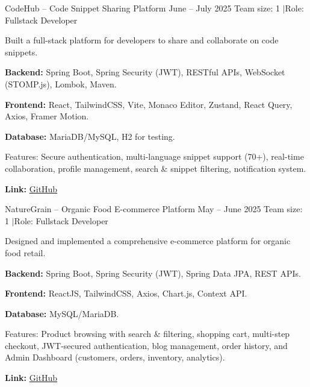 \vspace{4pt}

\projectEntry
    {CodeHub -- Code Snippet Sharing Platform}
    {June -- July 2025}
    {Team size: 1 \enspace$\vert$\enspace Role: Fullstack Developer}

\begin{entryItems}
    \item Built a full-stack platform for developers to share and collaborate on code snippets.
    \item \textbf{Backend:} Spring Boot, Spring Security (JWT), RESTful APIs, WebSocket (STOMP.js), Lombok, Maven.
    \item \textbf{Frontend:} React, TailwindCSS, Vite, Monaco Editor, Zustand, React Query, Axios, Framer Motion.
    \item \textbf{Database:} MariaDB/MySQL, H2 for testing.
    \item Features: Secure authentication, multi-language snippet support (70+), real-time collaboration, profile management, search \& snippet filtering, notification system.
    \item \textbf{Link:} \href{https://github.com/giasinguyen/codehub-platform}{GitHub}
\end{entryItems}

\vspace{4pt}

\projectEntry
    {NatureGrain -- Organic Food E-commerce Platform}
    {May -- June 2025}
    {Team size: 1 \enspace$\vert$\enspace Role: Fullstack Developer}

\begin{entryItems}
    \item Designed and implemented a comprehensive e-commerce platform for organic food retail.
    \item \textbf{Backend:} Spring Boot, Spring Security (JWT), Spring Data JPA, REST APIs.
    \item \textbf{Frontend:} ReactJS, TailwindCSS, Axios, Chart.js, Context API.
    \item \textbf{Database:} MySQL/MariaDB.
    \item Features: Product browsing with search \& filtering, shopping cart, multi-step checkout, JWT-secured authentication, blog management, order history, and Admin Dashboard (customers, orders, inventory, analytics).
    \item \textbf{Link:} \href{https://github.com/giasinguyen/naturegrain-ecommerce}{GitHub}
\end{entryItems}

